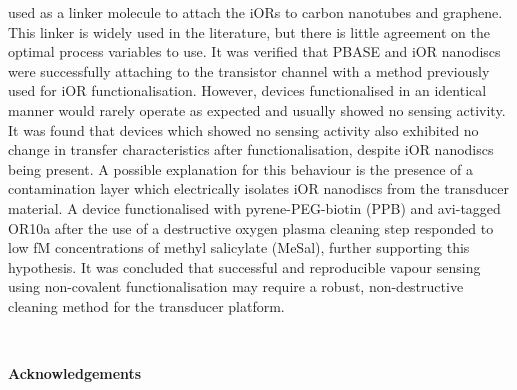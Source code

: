 used as a linker molecule to attach the iORs to carbon nanotubes and graphene. This linker is widely used in the literature, but there is little agreement on the optimal process variables to use. It was verified that PBASE and iOR nanodiscs were successfully attaching to the transistor channel with a method previously used for iOR functionalisation. However, devices functionalised in an identical manner would rarely operate as expected and usually showed no sensing activity. It was found that devices which showed no sensing activity also exhibited no change in transfer characteristics after functionalisation, despite iOR nanodiscs being present. A possible explanation for this behaviour is the presence of a contamination layer which electrically isolates iOR nanodiscs from the transducer material. A device functionalised with pyrene-PEG-biotin (PPB) and avi-tagged OR10a after the use of a destructive oxygen plasma cleaning step responded to low fM concentrations of methyl salicylate (MeSal), further supporting this hypothesis. It was concluded that successful and reproducible vapour sensing using non-covalent functionalisation may require a robust, non-destructive cleaning method for the transducer platform.

\fancyhf{} %
\thispagestyle{fancy} %
\renewcommand{\headrulewidth}{0pt}
\fancyfoot[L]{\thepage} %

\clearpage
\newpage
\thispagestyle{empty} %
\mbox{~}
\clearpage
\newpage


\thispagestyle{plain}

\begin{flushleft}
\huge\textbf{Acknowledgements}
\end{flushleft}

\vspace*{\baselineskip}

